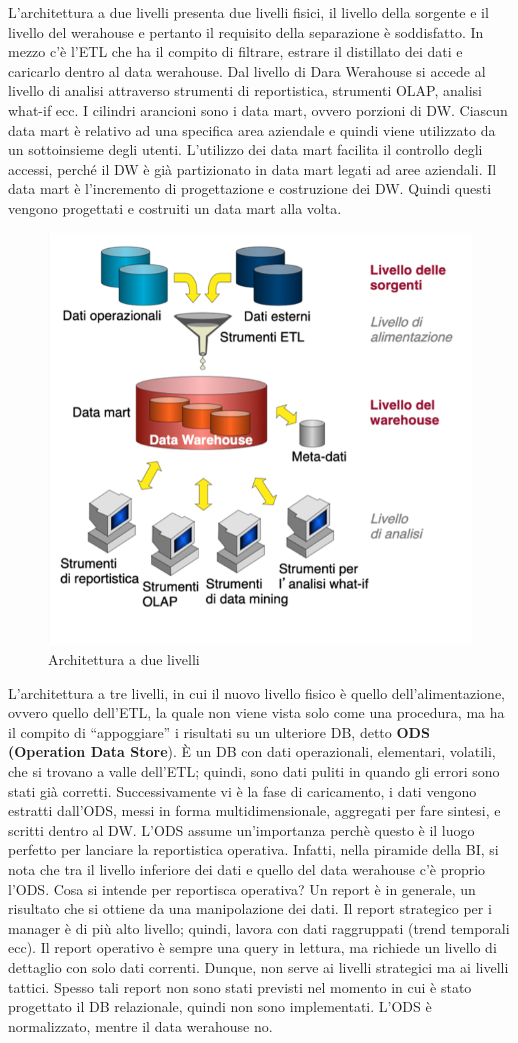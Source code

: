 L’architettura a due livelli presenta due livelli fisici, il livello della sorgente e il livello del werahouse e pertanto il requisito della separazione è soddisfatto. In mezzo c’è l’ETL che ha il compito di filtrare, estrare il distillato dei dati e caricarlo dentro al data werahouse. Dal livello di Dara Werahouse si accede al livello di analisi attraverso strumenti di reportistica, strumenti OLAP, analisi what-if ecc. I cilindri arancioni sono i data mart, ovvero porzioni di DW. Ciascun data mart è relativo ad una specifica area aziendale e quindi viene utilizzato da un sottoinsieme degli utenti. L’utilizzo dei data mart facilita il controllo degli accessi, perché il DW è già partizionato in data mart legati ad aree aziendali. Il data mart è l'incremento di progettazione e costruzione dei DW. Quindi questi vengono progettati e costruiti un data mart alla volta. 
\begin{figure}[H]
	\centering
	\includegraphics[width=0.6\linewidth]{img/arch2}
	\caption{Architettura a due livelli}
	\label{fig:arch2}
\end{figure}

L’architettura a tre livelli, in cui il nuovo livello fisico è quello dell’alimentazione, ovvero quello dell’ETL, la quale non viene vista solo come una procedura, ma ha il compito di “appoggiare” i risultati su un ulteriore DB, detto \textbf{ODS (Operation Data Store}). È un DB con dati operazionali, elementari, volatili, che si trovano a valle dell’ETL; quindi, sono dati puliti in quando gli errori sono stati già corretti. Successivamente vi è la fase di caricamento, i dati vengono estratti dall’ODS, messi in forma multidimensionale, aggregati per fare sintesi, e scritti dentro al DW. L'ODS assume un'importanza perchè questo è il luogo perfetto per lanciare la reportistica operativa. Infatti, nella piramide della BI, si nota che tra il livello inferiore dei dati e quello del data werahouse c’è proprio l’ODS. Cosa si intende per reportisca operativa? Un report è in generale, un risultato che si ottiene da una manipolazione dei dati. Il report strategico per i manager è di più alto livello; quindi, lavora con dati raggruppati (trend temporali ecc). Il report operativo è sempre una query in lettura, ma richiede un livello di dettaglio con solo dati correnti. Dunque, non serve ai livelli strategici ma ai livelli tattici. Spesso tali report non sono stati previsti nel momento in cui è stato progettato il DB relazionale, quindi non sono implementati. L’ODS è normalizzato, mentre il data werahouse no. \\

